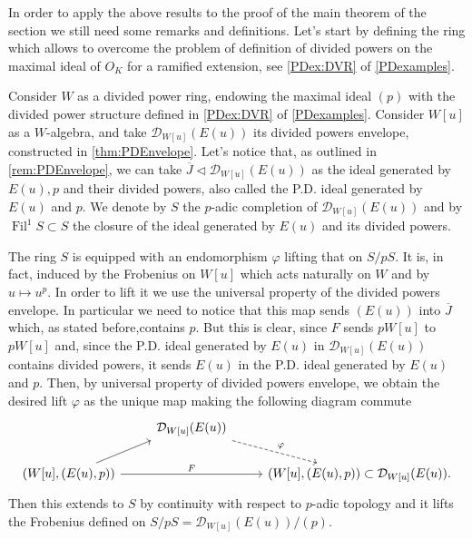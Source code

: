 \noindent
In order to apply the above results to the proof of the main theorem of the section
we still need some remarks and definitions.
Let's start by defining the ring which allows to overcome the problem of
definition of divided powers on the maximal ideal of $O_K$
for a ramified extension, see \cref{PDex:DVR} of \cref{PDexamples}.


\begin{defn}[]
	Consider $W$ as a divided power ring, endowing the maximal ideal $(p)$
	with the divided power structure defined in \cref{PDex:DVR} of \cref{PDexamples}.
	Consider $W[u]$ as a $W$-algebra, and take $\mathcal{D}_{W[u]}(E(u))$
	its divided powers envelope, constructed in \cref{thm:PDEnvelope}.
	Let's notice that, as outlined in \cref{rem:PDEnvelope},
	we can take $\overline{J} \triangleleft \mathcal{D}_{W[u]}(E(u))$ 
	as the ideal generated by $E(u), p$ and their divided powers,
	also called the P.D. ideal generated by $E(u)$ and $p$.
	We denote by $S$ the $p$-adic completion of $\mathcal{D}_{W[u]}(E(u))$
	and by $\operatorname{Fil}^1 S \subset S$ the closure of the ideal
	generated by $E(u)$ and its divided powers.
\end{defn}


\begin{rem}[]\label{rem:liftFrobeniusS}
	The ring $S$ is equipped with an endomorphism $\varphi$ lifting that on $S/pS$.
	It is, in fact, induced by the Frobenius on $W[u]$ which acts naturally
	on $W$ and by $u \mapsto u^p$.
	In order to lift it we use the universal property of
	the divided powers envelope.
	In particular we need to notice that this map sends $(E(u))$
	into $\overline{J}$ which, as stated before,contains $p$.
	But this is clear, since $F$ sends $pW[u]$ to $pW[u]$ and, 
	since the P.D. ideal generated by $E(u)$ in $\mathcal{D}_{W[u]}(E(u))$
	contains divided powers, it sends $E(u)$ in the P.D. ideal
	generated by $E(u)$ and $p$.
	Then, by universal property of divided powers envelope, we obtain the desired 
	lift $\varphi$ as the unique map making the following diagram commute
	\begin{equation*}
	\begin{tikzcd}
		&
		\mathcal{D}_{W[u]}(E(u))
		\arrow[rd, "\varphi", dashrightarrow,
		start anchor=south east] & \\
		\left( W[u], (E(u),p)\right) \arrow[ru, "", rightarrow,
		end anchor=south west] 
		\arrow[rr, "F", rightarrow] & &
		\left( W[u], (E(u),p)\right) \subset
		\mathcal{D}_{W[u]}(E(u)). 
	\end{tikzcd}
	\end{equation*}
	Then this extends to $S$ by continuity with respect to $p$-adic
	topology and it lifts the Frobenius defined on
	$S/pS = \mathcal{D}_{W[u]}(E(u))/ (p)$.
\end{rem}


